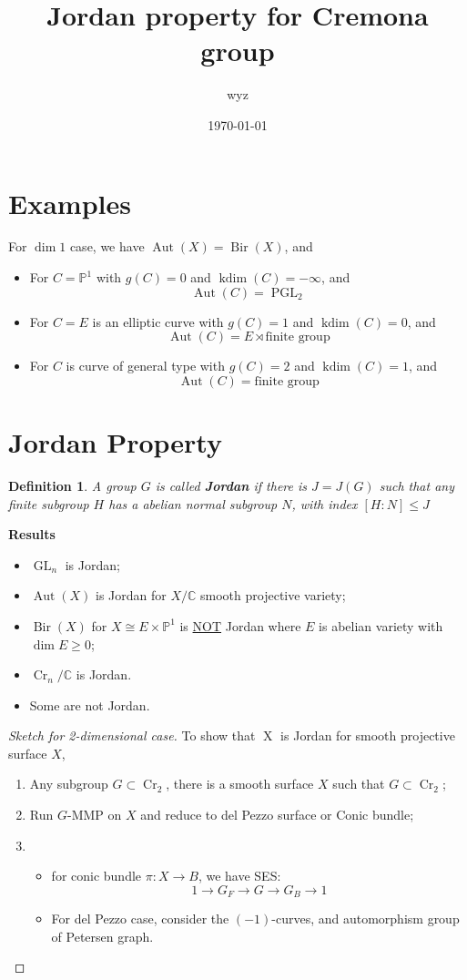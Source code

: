 \documentclass{article}
\title{Jordan property for Cremona group}
\author{wyz}
\date{\today}
\newtheorem{defn}{Definition}[section]
\begin{document}
\maketitle
\section{Examples}
For $\dim 1$ case, we have $ \operatorname{Aut}(X)=\operatorname{Bir}(X) $, and
\begin{itemize}
	\item For $C=\mathbb{P}^1$ with $g(C)=0$ and $ \operatorname{kdim}(C) =-\infty$, and
		\[
			\operatorname{Aut}(C) =\operatorname{PGL}_2
		\]
	\item For $C=E$ is an elliptic curve with $g(C)=1$ and $ \operatorname{kdim}(C) =0$, and
		\[
			\operatorname{Aut}(C) = E \rtimes \text{finite group}
		\]
	\item For $C$ is curve of general type with $g(C)=2$ and $ \operatorname{kdim}(C) =1$, and
		\[
			\operatorname{Aut}(C) =\text{finite group}
		\]
\end{itemize}
\section{Jordan Property}
\begin{defn}
	A group $G$ is called \textbf{Jordan} if there is $J=J(G)$ such that
	any finite subgroup $H$ has a abelian normal subgroup $N$, with index $ [H:N]\leqslant J $
\end{defn}
\textbf{Results}
\begin{itemize}
	\item $ \operatorname{GL}_n $ is Jordan;
	\item $ \operatorname{Aut}(X) $ is Jordan for $ X/\mathbb{C} $ smooth projective variety;
	\item $ \operatorname{Bir}(X) $ for $ X\cong E \times \mathbb{P}^1 $ is \underline{NOT} Jordan where $ E $ is abelian variety with $ \dim E\geqslant 0 $;
	\item $ \operatorname{Cr}_n/\mathbb{C} $ is Jordan.
	\item Some are not Jordan.
\end{itemize}

\begin{proof}[Sketch for 2-dimensional case]
	To show that $\operatorname{X}$ is Jordan for smooth projective surface $X$, 
	\begin{enumerate}[(1)]
		\item Any subgroup $ G\subset \operatorname{Cr}_2 $, there is a smooth surface $ X $ such that
			$ G\subset \operatorname{Cr}_2 $;
		\item Run $ G $-MMP on $X$ and reduce to del Pezzo surface or Conic bundle;
		\item \begin{itemize}
				\item for conic bundle $ \pi: X\to B $, we have SES:
						\[
							1\to G_F \to G \to G_B\to 1
						\]
				\item For del Pezzo case, consider the $(-1)$-curves, and automorphism group of Petersen graph.
			\end{itemize}
	\end{enumerate}
\end{proof}
\end{document}
